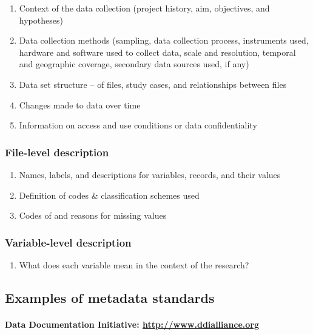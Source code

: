 \begin{enumerate}
\def\labelenumi{\arabic{enumi}.}
\tightlist
\item
  Context of the data collection (project history, aim, objectives, and
  hypotheses)
\item
  Data collection methods (sampling, data collection process,
  instruments used, hardware and software used to collect data, scale
  and resolution, temporal and geographic coverage, secondary data
  sources used, if any)
\item
  Data set structure -- of files, study cases, and relationships between
  files
\item
  Changes made to data over time
\item
  Information on access and use conditions or data confidentiality
\end{enumerate}

\subsubsection{File-level description}\label{file-level-description}

\begin{enumerate}
\def\labelenumi{\arabic{enumi}.}
\tightlist
\item
  Names, labels, and descriptions for variables, records, and their
  values
\item
  Definition of codes \& classification schemes used
\item
  Codes of and reasons for missing values
\end{enumerate}

\subsubsection{Variable-level
description}\label{variable-level-description}

\begin{enumerate}
\def\labelenumi{\arabic{enumi}.}
\tightlist
\item
  What does each variable mean in the context of the research?
\end{enumerate}

\subsection{Examples of metadata
standards}\label{examples-of-metadata-standards}

\paragraph{\texorpdfstring{Data Documentation Initiative:
\href{http://www.ddialliance.org/}{http://www.ddialliance.org}}{Data Documentation Initiative: http://www.ddialliance.org}}\label{data-documentation-initiative-httpwww.ddialliance.org}

